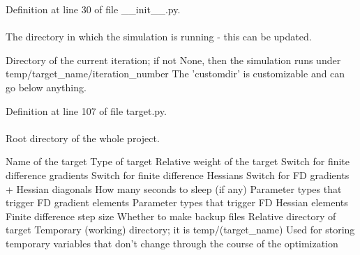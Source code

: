 \-Definition at line 30 of file \-\_\-\-\_\-init\-\_\-\-\_\-.\-py.

\hypertarget{classforcebalance_1_1target_1_1Target_a1da470037ef61c22dc44beb85cfa01a9}{
\paragraph[{rundir}]{}}\label{classforcebalance_1_1target_1_1Target_a1da470037ef61c22dc44beb85cfa01a9}


\-The directory in which the simulation is running -\/ this can be updated. 

\-Directory of the current iteration; if not \-None, then the simulation runs under temp/target\-\_\-name/iteration\-\_\-number \-The 'customdir' is customizable and can go below anything.

\-Definition at line 107 of file target.\-py.

\hypertarget{classforcebalance_1_1target_1_1Target_aede2856573b890cd47054ad36937d6f6}{
\paragraph[{tempdir}]{}}\label{classforcebalance_1_1target_1_1Target_aede2856573b890cd47054ad36937d6f6}


\-Root directory of the whole project. 

\-Name of the target \-Type of target \-Relative weight of the target \-Switch for finite difference gradients \-Switch for finite difference \-Hessians \-Switch for \-F\-D gradients + \-Hessian diagonals \-How many seconds to sleep (if any) \-Parameter types that trigger \-F\-D gradient elements \-Parameter types that trigger \-F\-D \-Hessian elements \-Finite difference step size \-Whether to make backup files \-Relative directory of target \-Temporary (working) directory; it is temp/(target\-\_\-name) \-Used for storing temporary variables that don't change through the course of the optimization 

